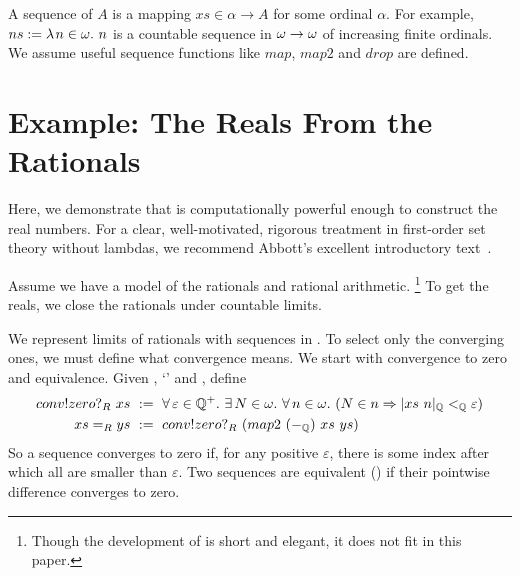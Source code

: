 A sequence of $A$ is a mapping $xs \in \alpha \to A$ for some ordinal $\alpha$.
For example, $ns := \lambda\mspace{2mu}{n \in \omega}\ldotp\, n$ is a countable sequence in $\omega \to \omega$ of increasing finite ordinals.
We assume useful sequence functions like $map$, $map2$ and $drop$ are defined.


\section{Example: The Reals From the Rationals}
\label{sec:reals}

Here, we demonstrate that \targetlang is computationally powerful enough to construct the real numbers. For a clear, well-motivated, rigorous treatment in first-order set theory without lambdas, we recommend Abbott's excellent introductory text~\cite{cit:abbott-analysis}.

Assume we have a model \tlzfc{\Rat,+_\Rat,-_\Rat,\times_\Rat,\div_\Rat} of the rationals and rational arithmetic.%
\footnote{Though the \targetlang development of \tlzfc{\Rat} is short and elegant, it does not fit in this paper.}
To get the reals, we close the rationals under countable limits.

We represent limits of rationals with sequences in \tlzfc{\lnat \to \Rat}. To select only the converging ones, we must define what convergence means. We start with convergence to zero and equivalence. Given \tlzfc{\Rat^+}, `\tlzfc{<_\Rat}' and \tlzfc{|\cdot|_\Rat}, define
\begin{equation}
\begin{aligned}
conv!zero?_R~xs&\ \objdef\ 
  \Forall{\varepsilon \in \Rat^+}
    \Exists{N \in \lnat}
      \Forall{n \in \lnat} (N \in n \imp |xs~n|_\Rat <_\Rat \varepsilon) \\
xs =_R ys&\ \objdef\ conv!zero?_R~(map2~(\minusq)~xs~ys)
\end{aligned}
\label{eqn:rational-conv-zero}
\end{equation}
So a sequence  converges to zero if, for any positive $\varepsilon$, there is some index  after which all  are smaller than $\varepsilon$. Two sequences are equivalent () if their pointwise difference converges to zero.


